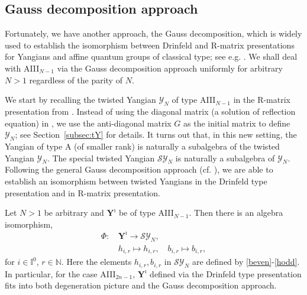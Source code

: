 \documentclass[11pt,reqno]{amsart}
\numberwithin{equation}{section}
\theoremstyle{definition}
\theoremstyle{remark}
\newcommand{\beq}{\begin{equation}}
\newcommand{\eeq}{\end{equation}}
\newcommand{\bN}{\mathbb{N}}
\newenvironment{customthm}[1]
	{\renewcommand\theinnercustomthm{#1}\innercustomthm}
	{\endinnercustomthm}
\newcommand{\Y}{{\mathscr{Y}}}
\newcommand{\SY}{{\mathscr{SY}}}
\newcommand{\Yi}{{\mathbf{Y}^\imath}}
\def \I{\mathbb{I}}
\begin{document}
\subsection{Gauss decomposition approach} 
Fortunately, we have another approach, the Gauss decomposition, which is widely used to establish the isomorphism between Drinfeld and R-matrix presentations for Yangians and affine quantum groups of classical type; see e.g. \cite{BK05,JLM18,FT23}. We shall deal with AIII$_{N-1}$ via the Gauss decomposition approach uniformly for arbitrary $N> 1$ regardless of the parity of $N$.

We start by recalling the twisted Yangian $\Y_{N}$ of type AIII$_{N-1}$ in the R-matrix presentation from \cite{MR02}. Instead of using the diagonal matrix (a solution of reflection equation) in \cite{MR02,KLWZ23a}, we use the anti-diagonal matrix $G$ as the initial matrix to define $\Y_N$; see Section~\ref{subsec:tY} for details. It turns out that, in this new setting, the Yangian of type A (of smaller rank) is naturally a subalgebra of the twisted Yangian $\Y_{N}$. The special twisted Yangian $\SY_{N}$ is naturally a subalgebra of $\Y_{N}$. Following the general Gauss decomposition approach (cf. \cite{BK05,KLWZ23a}), we are able to establish an isomorphism between twisted Yangians in the Drinfeld type presentation and in R-matrix presentation. 

\begin{customthm} {\bf B} [Theorem~\ref{main2}]
\label{th:B}
Let $N> 1$ be arbitrary and $\Yi$ be of type AIII$_{N-1}$. Then there is an algebra isomorphism,
\beq
\begin{split}
\Phi: &\,\Yi\to \SY_{N},\\
&\, h_{i,r}\mapsto h_{i,r},\quad b_{i,r}\mapsto b_{i,r},
\end{split}
\eeq
for $i\in \I^0$, $r\in\bN$. Here the elements $h_{i,r}, b_{i,r}$ in $\SY_{N}$ are defined by \eqref{beven}-\eqref{hodd}.
\end{customthm}
In particular, for the case AIII$_{2n-1}$, $\Yi$ defined via the Drinfeld type presentation fits into both degeneration picture and the Gauss decomposition approach.
\end{document}
